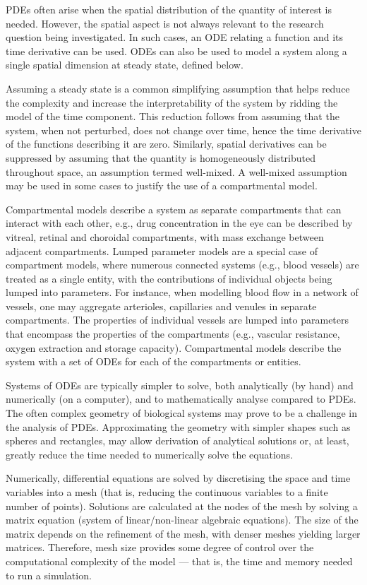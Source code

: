 \documentclass{article}
\begin{document}
PDEs often arise when the spatial distribution of the quantity of interest is needed.
However, the spatial aspect is not always relevant to the research question being investigated.
In such cases, an ODE relating a function and its time derivative can be used.
ODEs can also be used to model a system along a single spatial dimension at steady state, defined below.

Assuming a steady state is a common simplifying assumption that helps reduce the complexity and increase the interpretability of the system by ridding the model of the time component.
This reduction follows from assuming that the system, when not perturbed, does not change over time, hence the time derivative of the functions describing it are zero.
Similarly, spatial derivatives can be suppressed by assuming that the quantity is homogeneously distributed throughout space, an assumption termed well-mixed.
A well-mixed assumption may be used in some cases to justify the use of a compartmental model.

Compartmental models describe a system as separate compartments that can interact with each other, e.g., drug concentration in the eye can be described by vitreal, retinal and choroidal compartments, with mass exchange between adjacent compartments.
Lumped parameter models are a special case of compartment models, where numerous connected systems (e.g., blood vessels) are treated as a single entity, with the contributions of individual objects being lumped into parameters.
For instance, when modelling blood flow in a network of vessels, one may aggregate arterioles, capillaries and venules in separate compartments.
The properties of individual vessels are lumped into parameters that encompass the properties of the compartments (e.g., vascular resistance, oxygen extraction and storage capacity).
Compartmental models describe the system with a set of ODEs for each of the compartments or entities.

Systems of ODEs are typically simpler to solve, both analytically (by hand) and numerically (on a computer), and to mathematically analyse compared to PDEs.
The often complex geometry of biological systems may prove to be a challenge in the analysis of PDEs.
Approximating the geometry with simpler shapes such as spheres and rectangles, may allow derivation of analytical solutions or, at least, greatly reduce the time needed to numerically solve the equations.

Numerically, differential equations are solved by discretising the space and time variables into a mesh (that is, reducing the continuous variables to a finite number of points).
Solutions are calculated at the nodes of the mesh by solving a matrix equation (system of linear/non-linear algebraic equations).
The size of the matrix depends on the refinement of the mesh, with denser meshes yielding larger matrices.
Therefore, mesh size provides some degree of control over the computational complexity of the model --- that is, the time and memory needed to run a simulation.
\end{document}
